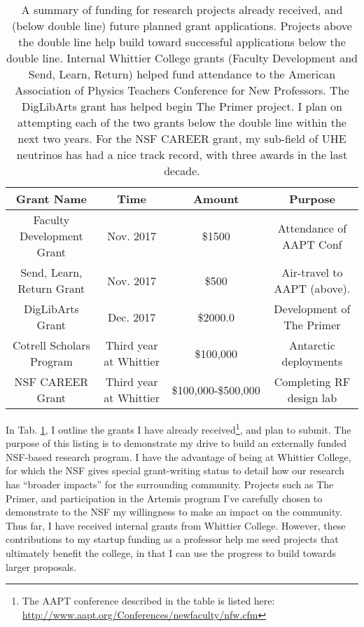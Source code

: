 \documentclass[../../main.tex]{subfiles}
\begin{document}
\begin{table}[hb]
\small
\centering
\begin{tabular}{|c|c|c|c|}
\hline \hline
Grant Name & Time & Amount & Purpose \\ \hline
Faculty Development Grant & Nov. 2017 & \$1500 & Attendance of AAPT Conf \\ \hline
Send, Learn, Return Grant & Nov. 2017 & \$500 & Air-travel to AAPT (above). \\ \hline
DigLibArts Grant & Dec. 2017 & \$2000.0 & Development of The Primer \\ \hline \hline
Cotrell Scholars Program & Third year at Whittier & \$100,000 & Antarctic deployments \\ \hline
NSF CAREER Grant & Third year at Whittier & \$100,000-\$500,000 & Completing RF design lab \\ \hline
\hline
\end{tabular}
\caption{\label{tab:fund} A summary of funding for research projects already received, and (below double line) future planned grant applications.  Projects above the double line help build toward successful applications below the double line. Internal Whittier College grants (Faculty Development and Send, Learn, Return) helped fund attendance to the American Association of Physics Teachers Conference for New Professors.  The DigLibArts grant has helped begin The Primer project.  I plan on attempting each of the two grants below the double line within the next two years.  For the NSF CAREER grant, my sub-field of UHE neutrinos has had a nice track record, with three awards in the last decade.}
\end{table}

In Tab. \ref{tab:fund}, I outline the grants I have already received\footnote{The AAPT conference described in the table is listed here: \url{http://www.aapt.org/Conferences/newfaculty/nfw.cfm}}, and plan to submit.  The purpose of this listing is to demonstrate my drive to build an externally funded NSF-based research program.  I have the advantage of being at Whittier College, for which the NSF gives special grant-writing status to detail how our research has ``broader impacts'' for the surrounding community.  Projects such as The Primer, and participation in the Artemis program I've carefully chosen to demonstrate to the NSF my willingness to make an impact on the community.  Thus far, I have received internal grants from Whittier College.  However, these contributions to my startup funding as a professor help me seed projects that ultimately benefit the college, in that I can use the progress to build towards larger proposals.
\end{document}
